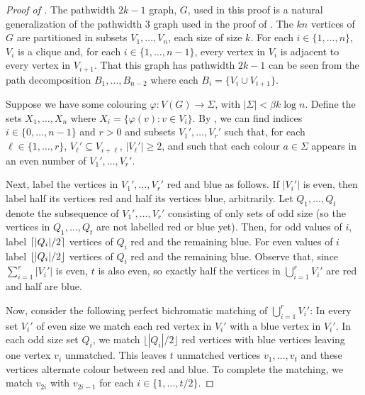 \documentclass{patmorin}
\begin{document}
\begin{proof}[Proof of ]
The pathwidth $2k-1$ graph, $G$, used in this proof is a natural
generalization of the pathwidth $3$ graph used in the proof of
.  The $kn$ vertices of $G$ are partitioned in subsets
$V_1,\ldots,V_n$, each size of size $k$.  For each $i\in\{1,\ldots,n\}$,
$V_i$ is a clique and, for each $i\in\{1,\ldots,n-1\}$, every
vertex in $V_i$ is adjacent to every vertex in $V_{i+1}$.  That this
graph has pathwidth $2k-1$ can be seen from the path decomposition
$B_1,\ldots,B_{n-2}$ where each $B_i=\{V_i\cup V_{i+1}\}$.

Suppose we have some colouring $\varphi:V(G)\to\Sigma$, with
$|\Sigma|<\beta k\log n$.  Define the sets $X_1,\ldots,X_n$ where
$X_i=\{\varphi(v): v\in V_i\}$.  By , we can find indices
$i\in\{0,\ldots,n-1\}$ and $r>0$ and subsets $V_1',\ldots,V_{r}'$ such
that, for each $\ell\in\{1,\ldots,r\}$,  $V_\ell'\subseteq V_{i+\ell}$, $|V_\ell'|\ge 2$,
and such that each colour $a\in\Sigma$ appears in an even number of
$V_1',\ldots,V_r'$.

Next, label the vertices in $V_1',\ldots,V_r'$ red and blue as
follows.  If $|V_i'|$ is even, then label half its vertices red and
half its vertices blue, arbitrarily.  Let $Q_1,\ldots,Q_t$ denote the
subsequence of $V_1',\ldots,V_r'$ consisting of only sets of odd size
(so the vertices in $Q_1,\ldots,Q_t$ are not labelled red or blue yet).
Then, for odd values of $i$, label ${\lceil |Q_i|/2 \rceil}$ vertices
of $Q_i$ red and the remaining blue.  For even values of $i$ label
${\lfloor |Q_i|/2 \rfloor}$ vertices of $Q_i$ red and the remaining blue.
Observe that, since $\sum_{i=1}^r|V_i'|$ is even, $t$ is also even,
so exactly half the vertices in $\bigcup_{i=1}^r V_i'$ are red and half
are blue.

Now, consider the following perfect bichromatic matching of
$\bigcup_{i=1}^r V_i'$: In every set $V_i'$ of even size we match each
red vertex in $V_i'$ with a blue vertex in $V_i'$.  In each odd size set
$Q_i$, we match $\lfloor|Q_i|/2\rfloor$ red vertices with blue vertices
leaving one vertex $v_i$ unmatched.  This leaves $t$ unmatched vertices
$v_1,\ldots,v_t$ and these vertices alternate colour between red and
blue. To complete the matching, we match $v_{2i}$ with $v_{2i-1}$ for
each $i\in\{1,\ldots,t/2\}$.


\end{proof}
\end{document}
